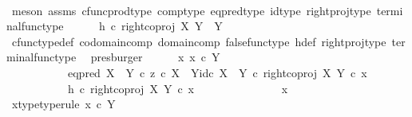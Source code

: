 \begin{isabellebody}
\ \ \ \ \ \ \ \isamarkupfalse%
\ {\isacharparenleft}{\kern0pt}meson\ assms\ cfunc{\isacharunderscore}{\kern0pt}prod{\isacharunderscore}{\kern0pt}type\ comp{\isacharunderscore}{\kern0pt}type\ eq{\isacharunderscore}{\kern0pt}pred{\isacharunderscore}{\kern0pt}type\ id{\isacharunderscore}{\kern0pt}type\ right{\isacharunderscore}{\kern0pt}proj{\isacharunderscore}{\kern0pt}type\ terminal{\isacharunderscore}{\kern0pt}func{\isacharunderscore}{\kern0pt}type{\isacharparenright}{\kern0pt}\isanewline
\ \ \ \ \isamarkupfalse%
\ {\isachardoublequoteopen}h\ {\isasymcirc}\isactrlsub c\ right{\isacharunderscore}{\kern0pt}coproj\ X\ Y\ {\isacharcolon}{\kern0pt}\ Y\ {\isasymrightarrow}\ {\isasymOmega}{\isachardoublequoteclose}\isanewline
\ \ \ \ \ \ \ \isamarkupfalse%
\ cfunc{\isacharunderscore}{\kern0pt}type{\isacharunderscore}{\kern0pt}def\ codomain{\isacharunderscore}{\kern0pt}comp\ domain{\isacharunderscore}{\kern0pt}comp\ false{\isacharunderscore}{\kern0pt}func{\isacharunderscore}{\kern0pt}type\ h{\isacharunderscore}{\kern0pt}def\ right{\isacharunderscore}{\kern0pt}proj{\isacharunderscore}{\kern0pt}type\ terminal{\isacharunderscore}{\kern0pt}func{\isacharunderscore}{\kern0pt}type\ \isamarkupfalse%
\ presburger\isanewline
\ \ \ \ \isamarkupfalse%
\ {\isachardoublequoteopen}{\isasymAnd}x{\isachardot}{\kern0pt}\ x\ {\isasymin}\isactrlsub c\ Y\ {\isasymLongrightarrow}\isanewline
\ \ \ \ \ \ \ \ \ \ \ {\isacharparenleft}{\kern0pt}{\isacharparenleft}{\kern0pt}eq{\isacharunderscore}{\kern0pt}pred\ {\isacharparenleft}{\kern0pt}X\ {\isasymCoprod}\ Y{\isacharparenright}{\kern0pt}\ {\isasymcirc}\isactrlsub c\ {\isasymlangle}z\ {\isasymcirc}\isactrlsub c\ {\isasymbeta}\isactrlbsub X\ {\isasymCoprod}\ Y\isactrlesub {\isacharcomma}{\kern0pt}id\isactrlsub c\ {\isacharparenleft}{\kern0pt}X\ {\isasymCoprod}\ Y{\isacharparenright}{\kern0pt}{\isasymrangle}{\isacharparenright}{\kern0pt}\ {\isasymcirc}\isactrlsub c\ right{\isacharunderscore}{\kern0pt}coproj\ X\ Y{\isacharparenright}{\kern0pt}\ {\isasymcirc}\isactrlsub c\ x\ {\isacharequal}{\kern0pt}\isanewline
\ \ \ \ \ \ \ \ \ \ \ {\isacharparenleft}{\kern0pt}h\ {\isasymcirc}\isactrlsub c\ right{\isacharunderscore}{\kern0pt}coproj\ X\ Y{\isacharparenright}{\kern0pt}\ {\isasymcirc}\isactrlsub c\ x{\isachardoublequoteclose}\isanewline
\ \ \ \ \isamarkupfalse%
\ {\isacharminus}{\kern0pt}\ \isanewline
\ \ \ \ \ \ \isamarkupfalse%
\ x\isanewline
\ \ \ \ \ \ \isamarkupfalse%
\ x{\isacharunderscore}{\kern0pt}type{\isacharbrackleft}{\kern0pt}type{\isacharunderscore}{\kern0pt}rule{\isacharbrackright}{\kern0pt}{\isacharcolon}{\kern0pt}\ {\isachardoublequoteopen}x\ {\isasymin}\isactrlsub c\ Y{\isachardoublequoteclose}\isanewline

\end{isabellebody}
